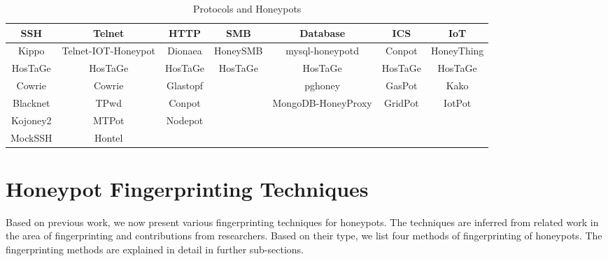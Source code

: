 \documentclass[letterpaper, 10 pt, conference]{ieeeconf}  %
\begin{document}
\begin{table*}[ht!]
\caption{\label{tab:Table1}Protocols and Honeypots}
\centering
 \begin{tabular}{||c c c c c c c||} 
 \hline
 SSH & Telnet & HTTP & SMB & Database & ICS & IoT\\ [0.5ex] 
 \hline
 Kippo & Telnet-IOT-Honeypot & Dionaea & HoneySMB & mysql-honeypotd & Conpot & HoneyThing\\ 
 
 HosTaGe &  HosTaGe &  HosTaGe &  HosTaGe &  HosTaGe &  HosTaGe &  HosTaGe  \\
 
 Cowrie & Cowrie & Glastopf &  & pghoney & GasPot & Kako\\

 Blacknet & TPwd & Conpot &  & MongoDB-HoneyProxy & GridPot & IotPot\\
 
 Kojoney2 & MTPot & Nodepot & & & & \\
 
 MockSSH & Hontel &  &  & & & \\ [1ex] 
 \hline
\end{tabular}

\end{table*}


\section{Honeypot Fingerprinting Techniques}

Based on previous work, we now present various fingerprinting techniques for honeypots. The techniques are inferred from related work in the area of fingerprinting and contributions from researchers. Based on their type, we list four methods of fingerprinting of honeypots. 
The fingerprinting methods are explained in detail in further sub-sections. 
\end{document}
